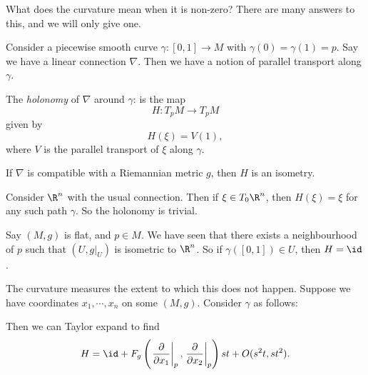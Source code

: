 \documentclass[a4paper]{article}
\begin{document}
What does the curvature mean when it is non-zero? There are many answers to this, and we will only give one.

\begin{defi}[Holonomy]
  Consider a piecewise smooth curve $\gamma: [0, 1] \to M$ with $\gamma(0) = \gamma(1) = p$. Say we have a linear connection $\nabla$. Then we have a notion of parallel transport along $\gamma$.

  The \emph{holonomy} of $\nabla$ around $\gamma$: is the map
  \[
    H: T_p M \to T_p M
  \]
  given by
  \[
    H(\xi) = V(1),
  \]
  where $V$ is the parallel transport of $\xi$ along $\gamma$.
\end{defi}

\begin{eg}
  If $\nabla$ is compatible with a Riemannian metric $g$, then $H$ is an isometry.
\end{eg}

\begin{eg}
  Consider $\R^n$ with the usual connection. Then if $\xi \in T_0\R^n$, then $H(\xi) = \xi$ for any such path $\gamma$. So the holonomy is trivial.
\end{eg}

\begin{eg}
  Say $(M, g)$ is flat, and $p \in M$. We have seen that there exists a neighbourhood of $p$ such that $(U, g|_U)$ is isometric to $\R^n$. So if $\gamma([0, 1]) \in U$, then $H = \id$.
\end{eg}

The curvature measures the extent to which this does not happen. Suppose we have coordinates $x_1, \cdots, x_n$ on some $(M, g)$. Consider $\gamma$ as follows:
\begin{center}
\end{center}
Then we can Taylor expand to find
\[
  H = \id + F_g\left(\left.\frac{\partial}{\partial x_1}\right|_p, \left.\frac{\partial}{\partial x_2}\right|_p\right)st + O(s^2 t, st^2).
\]

\printindex
\end{document}
